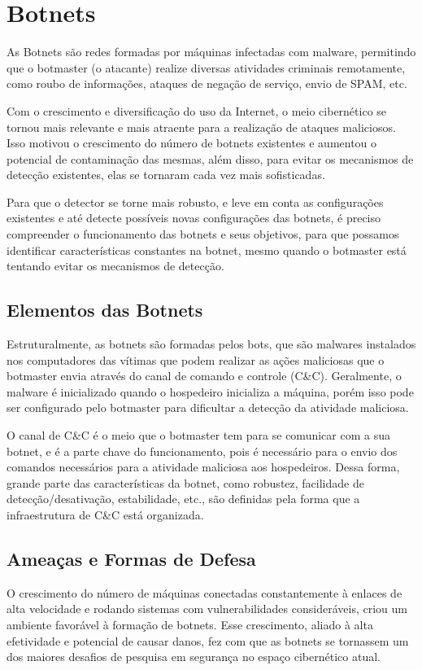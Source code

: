 \chapter{Botnets}
As Botnets são redes formadas por máquinas infectadas com malware, permitindo que o botmaster (o atacante) realize diversas atividades criminais remotamente, como roubo de informações, ataques de negação de serviço, envio de SPAM, etc.\cite{silva2013botnets}

Com o crescimento e diversificação do uso da Internet, o meio cibernético se tornou mais relevante e mais atraente para a realização de ataques maliciosos. Isso motivou o crescimento do número de botnets existentes e aumentou o potencial de contaminação das mesmas, além disso, para evitar os mecanismos de detecção existentes, elas se tornaram cada vez mais sofisticadas.

Para que o detector se torne mais robusto, e leve em conta as configurações existentes e até detecte possíveis novas configurações das botnets, é preciso compreender o funcionamento das botnets e seus objetivos, para que possamos identificar características constantes na botnet, mesmo quando o botmaster está tentando evitar os mecanismos de detecção.

\section{Elementos das Botnets}
Estruturalmente, as botnets são formadas pelos bots, que são malwares instalados nos computadores das vítimas que podem realizar as ações maliciosas que o botmaster envia através do canal de comando e controle (C\&C). Geralmente, o malware é inicializado quando o hospedeiro inicializa a máquina, porém isso pode ser configurado pelo botmaster para dificultar a detecção da atividade maliciosa.

O canal de C\&C é o meio que o botmaster tem para se comunicar com a sua botnet, e é a parte chave do funcionamento, pois é necessário para o envio dos comandos necessários para a atividade maliciosa aos hospedeiros. Dessa forma, grande parte das características da botnet, como robustez, facilidade de detecção/desativação, estabilidade, etc., são definidas pela forma que a infraestrutura de C\&C está organizada.

\section{Ameaças e Formas de Defesa}
O crescimento do número de máquinas conectadas constantemente à enlaces de alta velocidade e rodando sistemas com vulnerabilidades consideráveis, criou um ambiente favorável à formação de botnets. Esse crescimento, aliado à alta efetividade e potencial de causar danos, fez com que as botnets se tornassem um dos maiores desafios de pesquisa em segurança no espaço cibernético atual. \cite{soltani2014survey}

